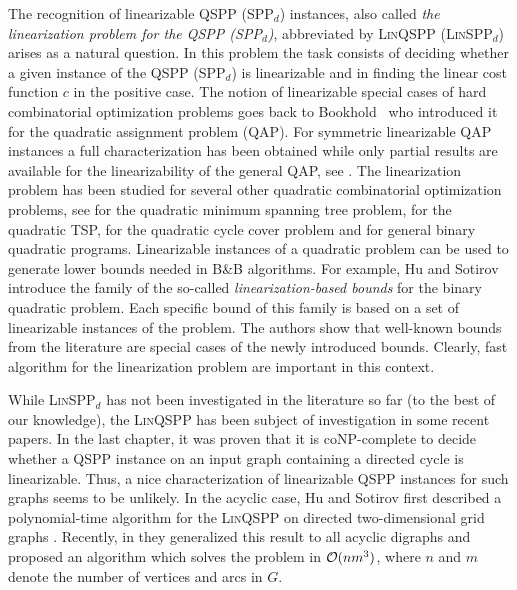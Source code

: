 The recognition of linearizable QSPP (SPP$_d$) instances, also
called \emph{the linearization problem for the QSPP (SPP$_d$)}, abbreviated by \textsc{Lin}QSPP (\textsc{Lin}SPP$_d$) arises 
as a natural question. In this problem the task 
consists of deciding whether a
given  instance of the  QSPP (SPP$_d$)  is linearizable and in finding the linear cost function
$c$ in the positive case.
The 
notion of 
linearizable special cases of hard
combinatorial optimization problems  goes back to
 Bookhold~\cite{bookhold1990contribution} who introduced 
 it for  the quadratic assignment problem (QAP). 
 For symmetric linearizable QAP instances a full characterization has been obtained while
 only partial results are available for the linearizability of the general QAP, see
 \cite{CeDeWo2016,Erdogan2006,ErTa2007,ErTa2011,kabadi2011n,punnen2013linear,waddellcharacterizing}.
The linearization problem has been studied for several other quadratic combinatorial optimization problems, see  \cite{CuPu2018,sotirov2021quadratic}
for the quadratic minimum spanning tree problem,  \cite{PuWaWo2017} for the quadratic TSP, \cite{deMeSo2020} for the quadratic cycle cover problem and  \cite{huSo2021} for general binary quadratic programs.  
Linearizable instances of  a quadratic problem can be used  to generate lower bounds  needed   in B\&B algorithms. For example, Hu and Sotirov introduce the family of the so-called \emph{linearization-based bounds} \cite{huSo2021} for the binary quadratic problem. Each specific bound of this family is based on   a set of linearizable instances of the problem. The authors show that 
well-known bounds from the literature are special cases of the newly introduced bounds.
Clearly, fast algorithm for the  linearization problem are important in 
this context.
\smallskip

While \textsc{Lin}SPP$_d$ has not been investigated in the literature so far (to the best of our knowledge), the  \textsc{Lin}QSPP has been subject of investigation in some recent papers.
In the last chapter, it was proven  that it  is  coNP-complete to decide whether a   QSPP instance on an   input graph
containing   a directed cycle is linearizable.    Thus, a nice characterization of linearizable QSPP
  instances for such  graphs
  seems to be
  unlikely.
   In the acyclic case, Hu and Sotirov first described a polynomial-time
   algorithm for the \textsc{Lin}QSPP  on  directed
   two-dimensional grid graphs \cite{huSo2018}. Recently, in  \cite{huSo2021} they  generalized this
   result to all acyclic digraphs and proposed  an algorithm which solves the
   problem in $\mathcal{O}(nm^3)$, where $n$ and $m$ denote the number of vertices and
   arcs in 
   $G$.
\smallskip
   
